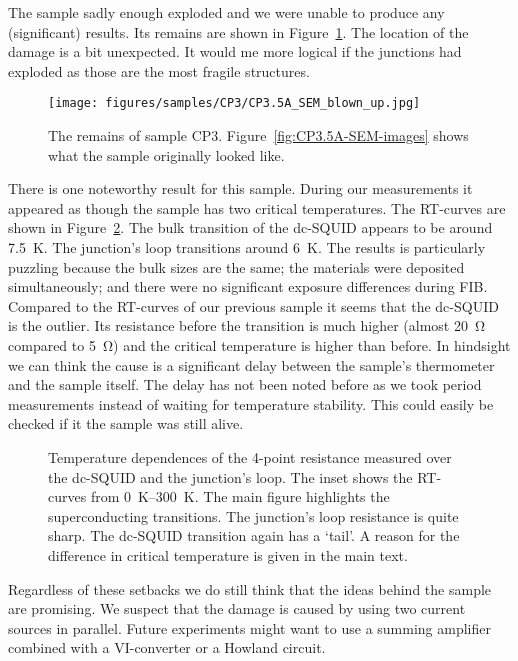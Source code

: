 The sample sadly enough exploded and we were unable to produce any (significant) results. Its remains are shown in Figure~\ref{fig:CP3.5A-remains}. The location of the damage is a bit unexpected. It would me more logical if the junctions had exploded as those are the most fragile structures.

\begin{figure}[ht!]	
	\centering
	\texttt{[image: figures/samples/CP3/CP3.5A\_SEM\_blown\_up.jpg]}
	\caption{The remains of sample CP3. Figure~\ref{fig:CP3.5A-SEM-images} shows what the sample originally looked like.}
	\label{fig:CP3.5A-remains}
\end{figure}

There is one noteworthy result for this sample. During our measurements it appeared as though the sample has two critical temperatures. The RT-curves are shown in Figure~\ref{fig:CP3.5A_RT_curves}. The bulk transition of the dc-SQUID appears to be around \qty{7.5}{\kelvin}. The junction's loop transitions around \qty{6}{\kelvin}. The results is particularly puzzling because the bulk sizes are the same; the materials were deposited simultaneously; and there were no significant exposure differences during FIB. Compared to the RT-curves of our previous sample it seems that the dc-SQUID is the outlier. Its resistance before the transition is much higher (almost \qty{20}{\ohm} compared to \qty{5}{\ohm}) and the critical temperature is higher than before. In hindsight we can think the cause is a significant delay between the sample's thermometer and the sample itself. The delay has not been noted before as we took period measurements instead of waiting for temperature stability. This could easily be checked if it the sample was still alive.

\begin{figure}[ht!]
	\centering
	
	\caption{Temperature dependences of the 4-point resistance measured over the dc-SQUID and the junction's loop. The inset shows the RT-curves from \qtyrange{0}{300}{\kelvin}. The main figure highlights the superconducting transitions. The junction's loop resistance is quite sharp. The dc-SQUID transition again has a `tail'. A reason for the difference in critical temperature is given in the main text.}
	\label{fig:CP3.5A_RT_curves}
\end{figure}

Regardless of these setbacks we do still think that the ideas behind the sample are promising. We suspect that the damage is caused by using two current sources in parallel. Future experiments might want to use a summing amplifier combined with a VI-converter or a Howland circuit.